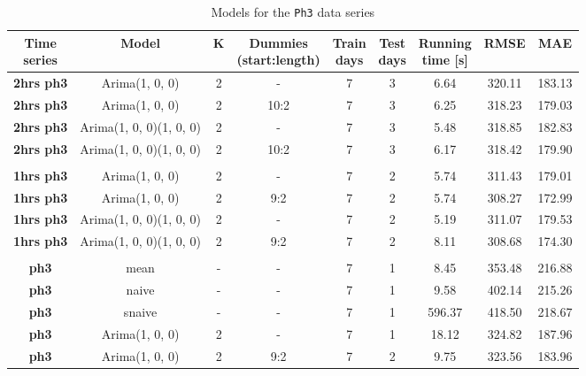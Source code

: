 \documentclass[12pt,a4paper,titlepage]{report}
\begin{document}
\begin{table}[htbp]
    \begin{tabular}{|c|c|c|c|c|c|c|c|c|}
        \hline
        \makecell{\textbf{Time} \\ \textbf{series}} & \textbf{Model}          & \textbf{K} & \makecell{\textbf{Dummies} \\ \textbf{(start:length)}} & \makecell{\textbf{Train} \\ \textbf{days}} & \makecell{\textbf{Test}\\ \textbf{days}} & \makecell{\textbf{Running} \\ \textbf{time {[}s{]}}} & \textbf{RMSE} & \textbf{MAE} \\ \hline
        \textbf{2hrs ph3} & Arima(1, 0, 0)          & 2 & -    & 7 & 3 & 6.64   & 320.11 & 183.13 \\ \hline
        \textbf{2hrs ph3} & Arima(1, 0, 0)          & 2 & 10:2 & 7 & 3 & 6.25   & 318.23 & 179.03 \\ \hline
        \textbf{2hrs ph3} & Arima(1, 0, 0)(1, 0, 0) & 2 & -    & 7 & 3 & 5.48   & 318.85 & 182.83 \\ \hline
        \textbf{2hrs ph3} & Arima(1, 0, 0)(1, 0, 0) & 2 & 10:2 & 7 & 3 & 6.17   & 318.42 & 179.90 \\ \hline
        \textbf{}         &                         &   &      &   &   &        &        &        \\ \hline
        \textbf{1hrs ph3} & Arima(1, 0, 0)          & 2 & -    & 7 & 2 & 5.74   & 311.43 & 179.01 \\ \hline
        \textbf{1hrs ph3} & Arima(1, 0, 0)          & 2 & 9:2  & 7 & 2 & 5.74   & 308.27 & 172.99 \\ \hline
        \textbf{1hrs ph3} & Arima(1, 0, 0)(1, 0, 0) & 2 & -    & 7 & 2 & 5.19   & 311.07 & 179.53 \\ \hline
        \textbf{1hrs ph3} & Arima(1, 0, 0)(1, 0, 0) & 2 & 9:2  & 7 & 2 & 8.11   & 308.68 & 174.30 \\ \hline
        \textbf{}         &                         &   &      &   &   &        &        &        \\ \hline
        \textbf{ph3}      & mean                    & - & -    & 7 & 1 & 8.45   & 353.48 & 216.88 \\ \hline
        \textbf{ph3}      & naive                   & - & -    & 7 & 1 & 9.58   & 402.14 & 215.26 \\ \hline
        \textbf{ph3}      & snaive                  & - & -    & 7 & 1 & 596.37 & 418.50 & 218.67 \\ \hline
        \textbf{ph3}      & Arima(1, 0, 0)          & 2 & -    & 7 & 1 & 18.12  & 324.82 & 187.96 \\ \hline
        \textbf{ph3}      & Arima(1, 0, 0)          & 2 & 9:2  & 7 & 2 & 9.75   & 323.56 & 183.96 \\ \hline
        
    \end{tabular}
    
    \centering
    \caption{Models for the \texttt{Ph3} data series}
    \label{ph3results}
\end{table}
\end{document}
